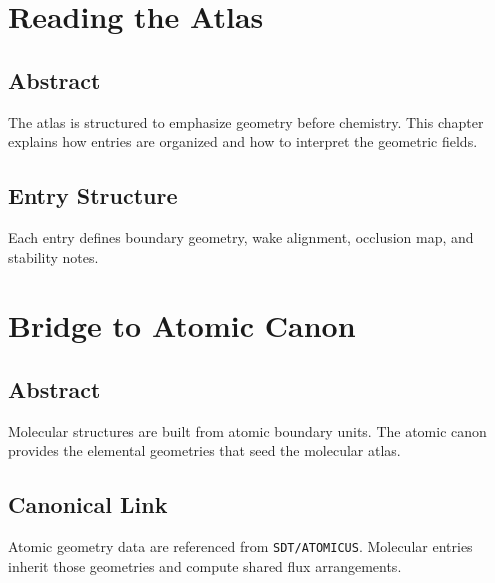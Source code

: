 \documentclass[12pt]{book}
\begin{document}
\chapter{Reading the Atlas}

\section*{Abstract}
The atlas is structured to emphasize geometry before chemistry. This chapter explains how entries are
organized and how to interpret the geometric fields.

\section{Entry Structure}
Each entry defines boundary geometry, wake alignment, occlusion map, and stability notes.

\chapter{Bridge to Atomic Canon}

\section*{Abstract}
Molecular structures are built from atomic boundary units. The atomic canon provides the elemental
geometries that seed the molecular atlas.

\section{Canonical Link}
Atomic geometry data are referenced from \texttt{SDT/ATOMICUS}. Molecular entries inherit those
geometries and compute shared flux arrangements.
\end{document}
